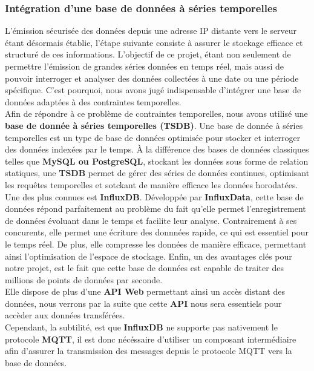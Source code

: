 \documentclass[10pt, a4paper]{report}
\begin{document}
	
	
	\subsubsection{Intégration d'une base de données à séries temporelles}
	
	L'émission sécurisée des données depuis une adresse IP distante vers le serveur étant désormais établie, l'étape suivante consiste à assurer le stockage efficace et structuré de ces informations. L'objectif de ce projet, étant non seulement de permettre l'émission de grandes séries données en temps réel, mais aussi de pouvoir interroger et analyser des données collectées à une date ou une période spécifique. C'est pourquoi, nous avons jugé indispensable d'intégrer une base de données adaptées à des contraintes temporelles.\\
	Afin de répondre à ce problème de contraintes temporelles, nous avons utilisé une \textbf{base de donnée à séries temporelles (TSDB)}. Une base de donnée à séries temporelles est un type de base de données optimisée pour stocker et interroger des données indexées par le temps. À la différence des bases de données classiques telles que \textbf{MySQL ou PostgreSQL}, stockant les données sous forme de relation statiques, une \textbf{TSDB} permet de gérer des séries de données continues, optimisant les requêtes temporelles et sotckant de manière efficace les données horodatées.\\
	Une des plus connues est \textbf{InfluxDB}. Développée par \textbf{InfluxData}, cette base de données répond parfaitement au problème du fait qu'elle permet l'enregistrement de données évoluant dans le temps et facilite leur analyse. Contrairement à ses concurents, elle permet une écriture des donnnées rapide, ce qui est essentiel pour le temps réel. De plus, elle compresse les données de manière efficace, permettant ainsi l'optimisation de l'espace de stockage. Enfin, un des avantages clés pour notre projet, est le fait que cette base de données est capable de traiter des millions de points de données par seconde.\\
	Elle dispose de plus d'une \textbf{API Web} permettant ainsi un accès distant des données, nous verrons par la suite que cette \textbf{API} nous sera essentiels pour accèder aux données transférées.\\
	Cependant, la subtilité, est que \textbf{InfluxDB} ne supporte pas nativement le protocole \textbf{MQTT}, il est donc nécéssaire d'utiliser un composant intermédiaire afin d'assurer la transmission des messages depuis le protocole MQTT vers la base de données.\\
\end{document}

